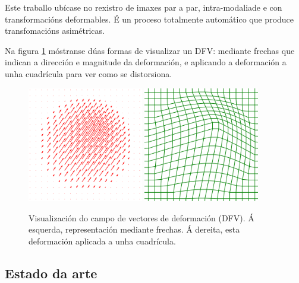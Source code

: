 Este traballo ubícase no rexistro de imaxes par a par, intra-modaliade e con transformacións deformables. É un proceso totalmente automático que produce transfomacións asimétricas.

Na figura \ref{fig:dfv_visualization} móstranse dúas formas de visualizar un DFV: mediante frechas que indican a dirección e magnitude da deformación, e aplicando a deformación a unha cuadrícula para ver como se distorsiona.

\begin{figure}[tbp]
    \centering
    \includegraphics[width=0.45\textwidth]{imaxes/dfv_arrows.png}
    \includegraphics[width=0.45\textwidth]{imaxes/dfv_grid.png}
    \caption{Visualización do campo de vectores de deformación (DFV). Á esquerda, representación mediante frechas. Á dereita, esta deformación aplicada a unha cuadrícula.}
    \label{fig:dfv_visualization}
\end{figure}

\subsection{Estado da arte}
\label{subsec:Estado da arte}


